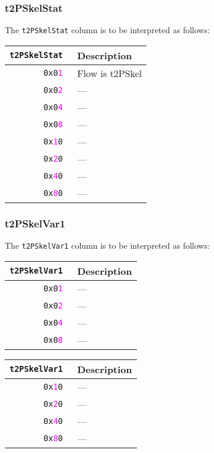 \documentclass[documentation]{subfiles}
\begin{document}
\subsubsection{t2PSkelStat}\label{t2PSkelStat}
The {\tt t2PSkelStat} column is to be interpreted as follows:
\begin{longtable}{>{\tt}rl}
    \toprule
    {\bf t2PSkelStat} & {\bf Description}\\
    \midrule\endhead%
    0x0\textcolor{magenta}{1} & Flow is t2PSkel\\
    0x0\textcolor{magenta}{2} & ---\\
    0x0\textcolor{magenta}{4} & ---\\
    0x0\textcolor{magenta}{8} & ---\\
    0x\textcolor{magenta}{1}0 & ---\\
    0x\textcolor{magenta}{2}0 & ---\\
    0x\textcolor{magenta}{4}0 & ---\\
    0x\textcolor{magenta}{8}0 & ---\\
    \bottomrule
\end{longtable}

\subsubsection{t2PSkelVar1}\label{t2PSkelVar1}
The {\tt t2PSkelVar1} column is to be interpreted as follows:\\
\begin{minipage}{.48\textwidth}
    \begin{longtable}{>{\tt}rl}
        \toprule
        {\bf t2PSkelVar1} & {\bf Description}\\
        \midrule\endhead%
        0x0\textcolor{magenta}{1} & ---\\
        0x0\textcolor{magenta}{2} & ---\\
        0x0\textcolor{magenta}{4} & ---\\
        0x0\textcolor{magenta}{8} & ---\\
        \bottomrule
    \end{longtable}
\end{minipage}
\hfill
\begin{minipage}{.48\textwidth}
    \begin{longtable}{>{\tt}rl}
        \toprule
        {\bf t2PSkelVar1} & {\bf Description}\\
        \midrule\endhead%
        0x\textcolor{magenta}{1}0 & ---\\
        0x\textcolor{magenta}{2}0 & ---\\
        0x\textcolor{magenta}{4}0 & ---\\
        0x\textcolor{magenta}{8}0 & ---\\
        \bottomrule
    \end{longtable}
\end{minipage}
\end{document}
